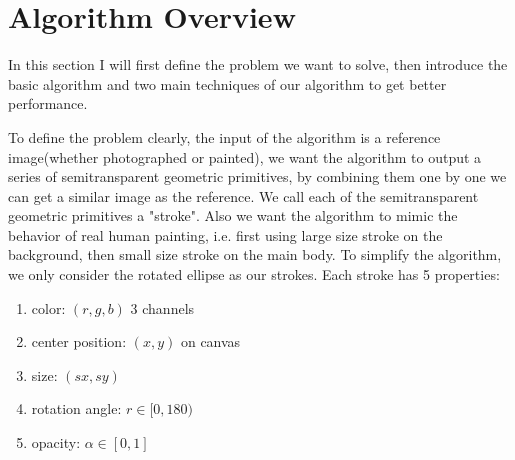 \documentclass[a4paper,conference]{IEEEtran}
\begin{document}
\section{Algorithm Overview}

In this section I will first define the problem we want to solve, then introduce the basic algorithm and two main techniques of our algorithm to get better performance. 

To define the problem clearly, the input of the algorithm is a reference image(whether photographed or painted), we want the algorithm to output a series of semitransparent geometric primitives, by combining them one by one we can get a similar image as the reference. We call each of the semitransparent geometric primitives a "stroke". Also we want the algorithm to mimic the behavior of real human painting, i.e. first using large size stroke on the background, then small size stroke on the main body. To simplify the algorithm, we only consider the rotated ellipse as our strokes. Each stroke has 5 properties:
\begin{enumerate}
    \item color: $(r,g,b)$ 3 channels
    \item center position: $(x,y)$ on canvas
    \item size: $(sx,sy)$
    \item rotation angle: $r \in [0, 180)$
    \item opacity: $\alpha \in [0, 1]$
\end{enumerate}
\end{document}
